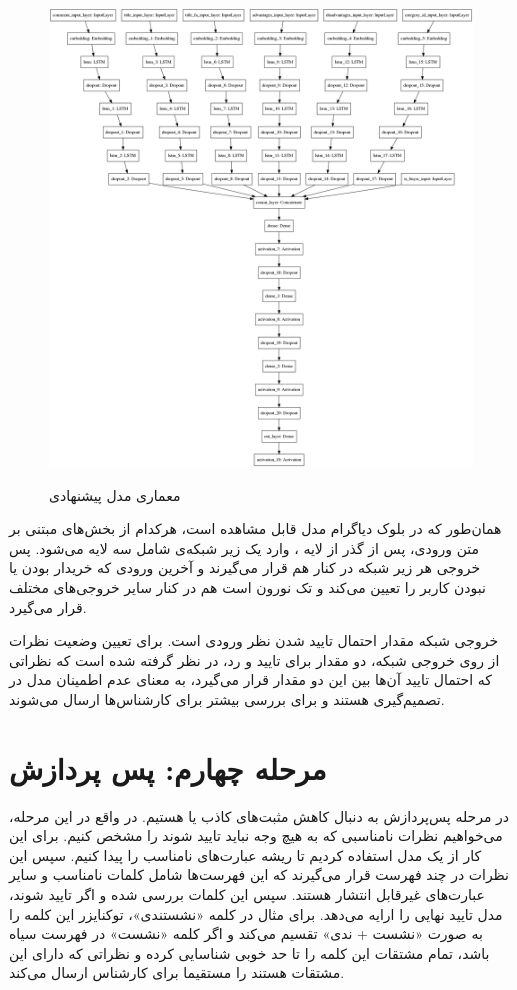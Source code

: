 \begin{figure}[H]
\centering
\caption{معماری مدل پیشنهادی}\label{}
\includegraphics[width=15cm]{figs/Model1.png}
\label{fig:test}
\end{figure}

همان‌طور که در بلوک دیاگرام مدل قابل مشاهده است، هرکدام از بخش‌های مبتنی بر متن ورودی، پس از گذر از لایه ، وارد یک زیر شبکه‌ی شامل سه لایه  می‌شود. پس خروجی هر زیر شبکه  در کنار هم قرار می‌گیرند و آخرین ورودی که خریدار بودن یا نبودن کاربر را تعیین می‌کند و تک نورون است هم در کنار سایر خروجی‌های مختلف قرار می‌گیرد.

خروجی شبکه مقدار احتمال تایید شدن نظر ورودی است. برای تعیین وضعیت نظرات از روی خروجی شبکه، دو مقدار  برای تایید و رد، در نظر گرفته شده‌ است که نظراتی که احتمال تایید آن‌ها بین این دو مقدار قرار می‌گیرد، به معنای عدم اطمینان مدل در تصمیم‌گیری هستند و برای بررسی بیشتر برای کارشناس‌ها ارسال می‌شوند.


\section{مرحله چهارم: پس پردازش}
در مرحله پس‌پردازش به دنبال کاهش مثبت‌های کاذب یا 
هستیم. در واقع در این مرحله، می‌خواهیم نظرات نامناسبی که به هیچ وجه نباید تایید شوند را مشخص کنیم. برای این کار از  یک مدل  استفاده کردیم تا ریشه عبارت‌های نامناسب را پیدا کنیم. سپس این نظرات در چند فهرست قرار می‌گیرند که این فهرست‌ها شامل کلمات نامناسب و سایر عبارت‌های غیرقابل انتشار هستند. سپس این کلمات بررسی شده و اگر تایید شوند، مدل تایید نهایی را ارایه می‌دهد.
برای مثال در کلمه‌ «نشستندی»، توکنایزر این کلمه را  به صورت «نشست + ندی» تقسیم می‌کند و اگر کلمه «نشست» در فهرست سیاه باشد،  تمام مشتقات این کلمه را تا حد خوبی شناسایی کرده و نظراتی که دارای این مشتقات هستند را مستقیما برای کارشناس ارسال می‌کند.

